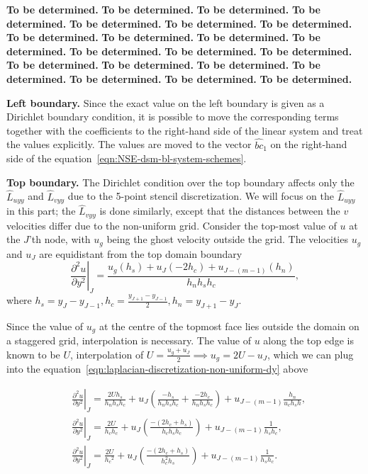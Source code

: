 \documentclass{article}
\begin{document}
\textbf{ To be determined.}\textbf{ To be determined.}\textbf{ To be determined.}\textbf{ To be determined.}\textbf{ To be determined.}\textbf{ To be determined.}\textbf{ To be determined.}\textbf{ To be determined.}\textbf{ To be determined.}\textbf{ To be determined.}\textbf{ To be determined.}\textbf{ To be determined.}\textbf{ To be determined.}\textbf{ To be determined.}\textbf{ To be determined.}\textbf{ To be determined.}\textbf{ To be determined.}\textbf{ To be determined.}\textbf{ To be determined.}\textbf{ To be determined.}\textbf{ To be determined.}


\textbf{Left boundary.} Since the exact value on the left boundary is given as a Dirichlet boundary condition, it is possible to move the corresponding terms together with the coefficients to the right-hand side of the linear system and treat the values explicitly. The values are moved to the vector $\hat{bc}_1$ on the right-hand side of the equation~\eqref{eqn:NSE-dsm-bl-system-schemes}.

\textbf{Top boundary.} The Dirichlet condition over the top boundary affects only the $\hat{L}_{uyy}$ and $\hat{L}_{vyy}$ due to the 5-point stencil discretization. We will focus on the $\hat{L}_{uyy}$ in this part; the $\hat{L}_{vyy}$ is done similarly, except that the distances between the $v$ velocities differ due to the non-uniform grid. Consider the top-most value of $u$ at the $J$'th node, with $u_g$ being the ghost velocity outside the grid. The velocities $u_g$ and $u_J$ are equidistant from the top domain boundary
\begin{equation}\label{eqn:laplacian-discretization-non-uniform-dy}
\left.\frac{\partial^2 u}{\partial y^2}\right|_J=\frac{u_g\left(h_s\right)+u_J\left(-2 h_c\right)+u_{J-(m-1)}\left(h_n\right)}{h_n h_s h_c},
\end{equation}
where $h_s=y_J-y_{J-1}, h_c = \frac{y_{J+1}-y_{J-1}}{2}, h_n = y_{J+1}-y_J$.

Since the value of $u_g$ at the centre of the topmost face lies outside the domain on a staggered grid, interpolation is necessary. The value of $u$ along the top edge is known to be $U$, interpolation of $U = \frac{u_g+u_J}{2}\implies u_g=2U-u_J$, which we can plug into the equation~\eqref{eqn:laplacian-discretization-non-uniform-dy} above

\begin{equation}
\begin{aligned}
& \left.\frac{\partial ^2 u}{\partial y^2}\right|_J=\frac{2 U h_s}{h_n h_s h_c}+u_J\left(\frac{-h_s}{h_n h_s h_c}+\frac{-2 h_c}{h_n h_s h_c}\right)+u_{J-(m-1)} \frac{h_n}{u_c h_s h},\\
& \left.\frac{\partial^2 u}{\partial y^2}\right|_J=\frac{2 U}{h_c h_c}+u_J\left(\frac{-\left(2 h_c+h_s\right)}{h_c h_s h_c}\right)+u_{J-(m-1)} \frac{1}{h_s h_c}, \\
& \left.\frac{\partial^2 u}{\partial y^2}\right|_J=\frac{2 U}{h_c{ }^2}+u_J\left(\frac{-\left(2 h_c+h_s\right)}{h_c^2 h_s}\right)+u_{J-(m-1)} \frac{1}{h_s h_c}.
\end{aligned}
\end{equation}
\end{document}
